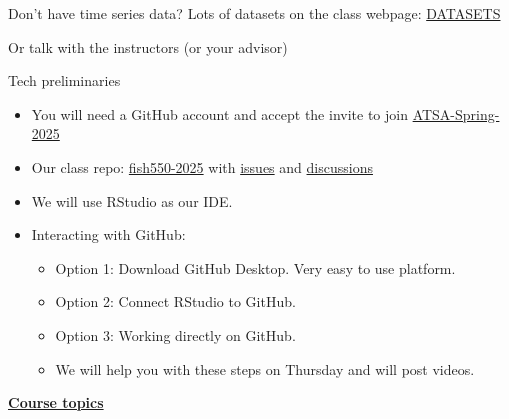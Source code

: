 \documentclass[
  ignorenonframetext,
]{beamer}
\providecommand{\tightlist}{%
  \setlength{\itemsep}{0pt}\setlength{\parskip}{0pt}}
\begin{document}
\begin{frame}{Don't have time series data?}
\label{dont-have-time-series-data}
Lots of datasets on the class webpage:
\href{https://atsa-es.github.io/atsa/data_sets.html}{DATASETS}

Or talk with the instructors (or your advisor)
\end{frame}

\begin{frame}{Tech preliminaries}
\label{tech-preliminaries}
\begin{itemize}
\tightlist
\item
  You will need a GitHub account and accept the invite to join
  \href{https://github.com/orgs/atsa-es/teams/atsa-spring-2025}{ATSA-Spring-2025}
\item
  Our class repo:
  \href{https://github.com/atsa-es/fish550-2025}{fish550-2025} with
  \href{https://github.com/atsa-es/fish550-2025/issues}{issues} and
  \href{https://github.com/atsa-es/fish550-2025/discussions}{discussions}
\item
  We will use RStudio as our IDE.
\item
  Interacting with GitHub:

  \begin{itemize}
  \tightlist
  \item
    Option 1: Download GitHub Desktop. Very easy to use platform.
  \item
    Option 2: Connect RStudio to GitHub.
  \item
    Option 3: Working directly on GitHub.
  \item
    We will help you with these steps on Thursday and will post videos.
  \end{itemize}
\end{itemize}
\end{frame}

\begin{frame}{}
\label{section}
\href{https://atsa-es.github.io/atsa}{\textbf{Course topics}}
\end{frame}
\end{document}
